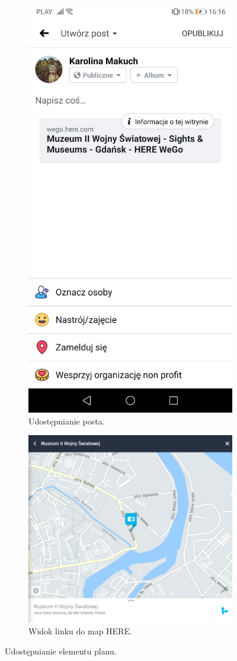 \documentclass[10pt,twoside,a4paper]{report}
\begin{document}
\begin{figure}[h]
\begin{subfigure}{0.3\textwidth}
\centering
\includegraphics[width=0.9\linewidth, width=5cm]{shareOnFacebook}
\caption{Udostępnianie posta.}
\label{fig:shareOnFacebook}
\end{subfigure}
\begin{subfigure}{0.7\textwidth}
\centering
\includegraphics[width=0.9\linewidth, width=9cm]{hereMobile}
\caption{Widok linku do map HERE.}
\label{fig:hereMobile}
\end{subfigure}
\caption{Udostępnianie elementu planu.}
\label{fig:podrecznik8}
\end{figure}
\FloatBarrier
\end{document}
